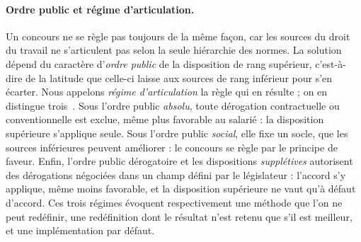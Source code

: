 \documentclass[review]{jflart}
\begin{document}
\paragraph{Ordre public et régime d'articulation.} Un concours ne se règle pas
  toujours de la même façon, car les sources du droit du travail ne
  s'articulent pas selon la seule hiérarchie des normes. La solution dépend du
  caractère d'\emph{ordre public} de la disposition de rang supérieur,
  c'est-à-dire de la latitude que celle-ci laisse aux sources de rang inférieur
  pour s'en écarter. Nous appelons \emph{régime d'articulation} la règle qui en
  résulte ; on en distingue trois~\cite{viepublique2021}. Sous l'ordre public
  \emph{absolu}, toute dérogation contractuelle ou conventionnelle est exclue,
  même plus favorable au salarié : la disposition supérieure s'applique seule.
  Sous l'ordre public \emph{social}, elle fixe un socle, que les sources
  inférieures peuvent améliorer : le concours se règle par le principe de
  faveur. Enfin, l'ordre public dérogatoire et les dispositions
  \emph{supplétives} autorisent des dérogations négociées dans un champ défini
  par le législateur : l'accord s'y applique, même moins favorable, et la
  disposition supérieure ne vaut qu'à défaut d'accord. Ces trois régimes
  évoquent respectivement une méthode que l'on ne peut redéfinir, une
  redéfinition dont le résultat n'est retenu que s'il est meilleur, et une
  implémentation par défaut.
  
\end{document}
